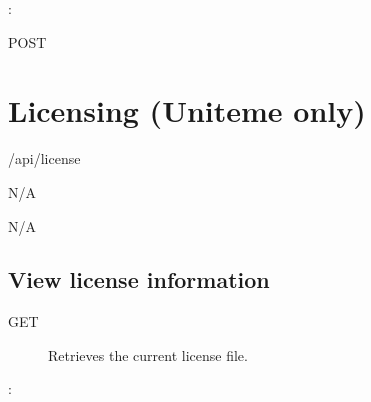 \documentclass[letterpaper,10pt,english]{sphinxmanual}
\begin{document}
:

\begin{sphinxVerbatim}[commandchars=\\\{\}]
\end{sphinxVerbatim}

 POST


\section{Licensing (Uniteme only)}
\label{\detokenize{restapi:licensing-uniteme-only}}
 /api/license

 N/A

 N/A


\subsection{View license information}
\label{\detokenize{restapi:view-license-information}}\begin{description}
\item[{ GET}] \leavevmode
Retrieves the current license file.

\end{description}

:
\end{document}
